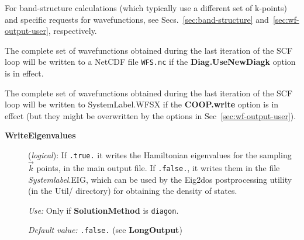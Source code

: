 \documentclass[11pt]{article}
\begin{document}
For band-structure calculations (which typically use a different set
of k-points) and specific requests for wavefunctions, see
Secs.~\ref{sec:band-structure} and~\ref{sec:wf-output-user}, respectively.

The complete set of wavefunctions obtained during the last
iteration of the SCF loop will be written to a NetCDF file
{\tt WFS.nc} if the {\bf Diag.UseNewDiagk} option is in effect.

The complete set of wavefunctions obtained during the last
iteration of the SCF loop will be written to SystemLabel.WFSX
if the {\bf COOP.write} option is in effect (but they might be
overwritten by the options in Sec~\ref{sec:wf-output-user}).

\begin{description}
\item[{\bf WriteEigenvalues}] ({\it logical}):
If {\tt .true.} it writes the Hamiltonian eigenvalues for the sampling
$\vec k$ points, in the main output file.
If {\tt .false.}, it writes them in the file {\it Systemlabel}.EIG,
which can be used by the {\sc Eig2dos} postprocessing
utility (in the Util/ directory) for obtaining the density of
states.

{\it Use:} Only if {\bf SolutionMethod} is {\tt diagon}.

{\it Default value:} {\tt .false.} (see {\bf LongOutput})

\end{description}
\end{document}
